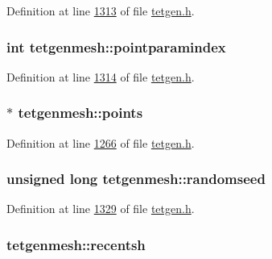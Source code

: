 Definition at line \hyperlink{tetgen_8h_source_l01313}{1313} of file \hyperlink{tetgen_8h_source}{tetgen.\+h}.

\subsubsection[{\texorpdfstring{pointparamindex}{pointparamindex}}]{\setlength{\rightskip}{0pt plus 5cm}int tetgenmesh\+::pointparamindex}\hypertarget{classtetgenmesh_a6e119fd6f1234c3215f93b1443a554ce}{}\label{classtetgenmesh_a6e119fd6f1234c3215f93b1443a554ce}


Definition at line \hyperlink{tetgen_8h_source_l01314}{1314} of file \hyperlink{tetgen_8h_source}{tetgen.\+h}.

\subsubsection[{\texorpdfstring{points}{points}}]{ $\ast$ tetgenmesh\+::points}\hypertarget{classtetgenmesh_a419c24648d1c776238575e9f950b1124}{}\label{classtetgenmesh_a419c24648d1c776238575e9f950b1124}


Definition at line \hyperlink{tetgen_8h_source_l01266}{1266} of file \hyperlink{tetgen_8h_source}{tetgen.\+h}.

\subsubsection[{\texorpdfstring{randomseed}{randomseed}}]{\setlength{\rightskip}{0pt plus 5cm}unsigned long tetgenmesh\+::randomseed}\hypertarget{classtetgenmesh_a7a81e8968d62ee9b09fb4b3df9acddd5}{}\label{classtetgenmesh_a7a81e8968d62ee9b09fb4b3df9acddd5}


Definition at line \hyperlink{tetgen_8h_source_l01329}{1329} of file \hyperlink{tetgen_8h_source}{tetgen.\+h}.

\subsubsection[{\texorpdfstring{recentsh}{recentsh}}]{ tetgenmesh\+::recentsh}\hypertarget{classtetgenmesh_a4a048baa9087fca5c9ce9df91ad3a60f}{}\label{classtetgenmesh_a4a048baa9087fca5c9ce9df91ad3a60f}


